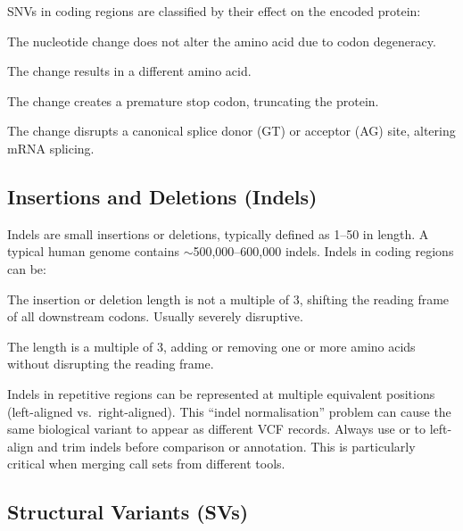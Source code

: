 SNVs in coding regions are classified by their effect on the encoded protein:
\begin{description}[nosep]
  \item[Synonymous (silent)] The nucleotide change does not alter the amino acid due to codon degeneracy.
  \item[Missense] The change results in a different amino acid.
  \item[Nonsense] The change creates a premature stop codon, truncating the protein.
  \item[Splice-site] The change disrupts a canonical splice donor (GT) or acceptor (AG) site, altering mRNA splicing.
\end{description}

\subsection{Insertions and Deletions (Indels)}

Indels are small insertions or deletions, typically defined as 1--50\basepair{} in length. A typical human genome contains $\sim$500,000--600,000 indels. Indels in coding regions can be:

\begin{description}[nosep]
  \item[Frameshift] The insertion or deletion length is not a multiple of 3, shifting the reading frame of all downstream codons. Usually severely disruptive.
  \item[In-frame] The length is a multiple of 3, adding or removing one or more amino acids without disrupting the reading frame.
\end{description}

\begin{warningbox}[title={Indel Representation Ambiguity}]
Indels in repetitive regions can be represented at multiple equivalent positions (left-aligned vs.\ right-aligned). This ``indel normalisation'' problem can cause the same biological variant to appear as different VCF records. Always use  or  to left-align and trim indels before comparison or annotation. This is particularly critical when merging call sets from different tools.
\end{warningbox}

\subsection{Structural Variants (SVs)}

